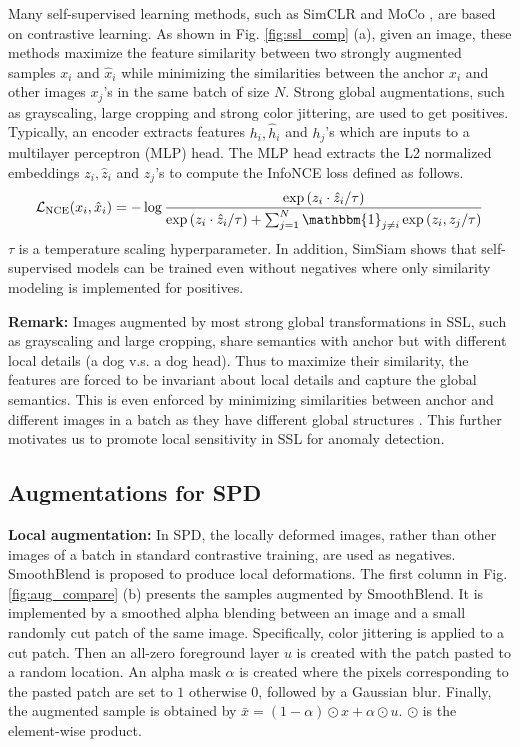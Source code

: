 \documentclass[runningheads]{llncs}
\begin{document}
Many self-supervised learning methods, such as SimCLR \cite{chen2020simple} and MoCo \cite{he2020momentum}, are based on contrastive learning. As shown in Fig. \ref{fig:ssl_comp} (a), given an image, these methods maximize the feature similarity between two strongly augmented samples $x_i$ and $\hat{x}_i$ while minimizing the similarities between the anchor $x_i$ and other images $x_j$'s in the same batch of size $N$. Strong global augmentations, such as grayscaling, large cropping and strong color jittering, are used to get positives. Typically, an encoder extracts features $h_i,\hat{h}_i$ and $h_j$'s which are inputs to a multilayer perceptron (MLP) head. The MLP head extracts the L2 normalized embeddings $z_i,\hat{z}_i$ and $z_j$'s to compute the InfoNCE loss defined as follows.
\begin{equation}
    \mathcal{L}_{\mathrm{NCE}}(x_i,\hat{x}_i)= -\log\frac{\exp{(z_i\cdot \hat{z}_i/\tau)}}{\exp{(z_i\cdot \hat{z}_i/\tau)}+\sum_{j=1}^{N}\mathbbm{1}_{j\neq i}\exp{(z_i,z_j}/\tau)}
    \label{eqn:loss_nce}
\end{equation}
$\tau$ is a temperature scaling hyperparameter. In addition, SimSiam \cite{chen2021exploring} shows that self-supervised models can be trained even without negatives where only similarity modeling is implemented for positives.

\noindent\textbf{Remark:} Images augmented by most strong global transformations in SSL, such as grayscaling and large cropping, share semantics with anchor but with different local details (a dog v.s. a dog head). Thus to maximize their similarity, the features are forced to be invariant about local details and capture the global semantics. This is even enforced by minimizing similarities between anchor and different images in a batch as they have different global structures \cite{chen2020simple,ericsson2021self}. This further motivates us to promote local sensitivity in SSL for anomaly detection.
\subsection{Augmentations for SPD}
\noindent\textbf{Local augmentation:} In SPD, the locally deformed images, rather than other images of a batch in standard contrastive training, are used as negatives. SmoothBlend is proposed to produce local deformations. The first column in Fig. \ref{fig:aug_compare} (b) presents the samples augmented by SmoothBlend. It is implemented by a smoothed alpha blending between an image and a small randomly cut patch of the same image. Specifically, color jittering is applied to a cut patch. Then an all-zero foreground layer $u$ is created with the patch pasted to a random location. An alpha mask $\alpha$ is created where the pixels corresponding to the pasted patch are set to $1$ otherwise $0$, followed by a Gaussian blur. Finally, the augmented sample is obtained by $\bar{x} = (1-\alpha) \odot x + \alpha \odot u$. $\odot$ is the element-wise product. 
\end{document}
